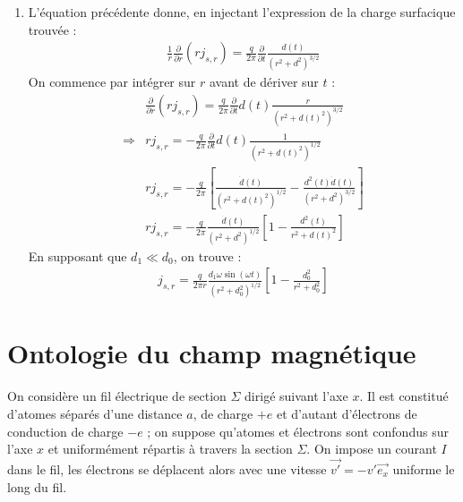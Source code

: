 \begin{correction}
\begin{enumerate}
\begin{enumerate}
		On retrouve alors facilement l'équation :
		\begin{align*}
			\frac{1}{r}\frac{\partial}{\partial r}\left(r j_{s,r} \right) +\frac{\partial \sigma}{\partial t}=0
		\end{align*}
		
		\item L'équation précédente donne, en injectant l'expression de la charge surfacique trouvée : 
		\begin{align*}
			\frac{1}{r}\frac{\partial}{\partial r}\left(r j_{s,r} \right) = \frac{q}{2\pi}\frac{\partial}{\partial t}\frac{d(t)}{(r^2+d^2)^{3/2}}
		\end{align*}
		On commence par intégrer sur $r$ avant de dériver sur $t$ :
		\begin{align*}
			& \frac{\partial}{\partial r}\left(r j_{s,r} \right) = \frac{q}{2\pi}\frac{\partial}{\partial t}d(t)\frac{r}{(r^2+d(t)^2)^{3/2}} \\
			\Rightarrow & r j_{s,r}= -\frac{q}{2\pi}\frac{\partial}{\partial t}d(t)\frac{1}{(r^2+d(t)^2)^{1/2}} \\
			& r j_{s,r}=-\frac{q}{2\pi}\left[\frac{\dot{d}(t)}{(r^2+d(t)^2)^{1/2}}-\frac{d^2(t)\dot{d}(t)}{(r^2+d^2)^{3/2}}\right] \\
			& r j_{s,r}=-\frac{q}{2\pi}\frac{\dot{d}(t)}{(r^2+d^2)^{1/2}}\left[1-\frac{d^2(t)}{r^2+d(t)^2}\right]
		\end{align*}
		En supposant que $d_1\ll d_0$, on trouve : 
		\begin{align*}
			j_{s,r}=\frac{q}{2\pi r}\frac{d_1\omega\sin(\omega t)}{(r^2+d_0^2)^{1/2}}\left[1-\frac{d^2_0}{r^2+d_0^2}\right]
		\end{align*}
		
	
	\end{enumerate}
\end{enumerate}

\end{correction}

\newpage

\section{Ontologie du champ magnétique}

On considère un fil électrique de section $\Sigma$ dirigé suivant l'axe $x$. Il est constitué d'atomes séparés d'une distance $a$, de charge $+e$  et d'autant d'électrons de conduction de charge $-e$ ; on suppose qu'atomes et électrons sont confondus sur l'axe $x$ et uniformément répartis à travers la section $\Sigma$. On impose un courant $I$ dans le fil, les électrons se déplacent alors avec une vitesse $\vec{v'}=-v'\vec{e_{x}}$ uniforme le long du fil.


